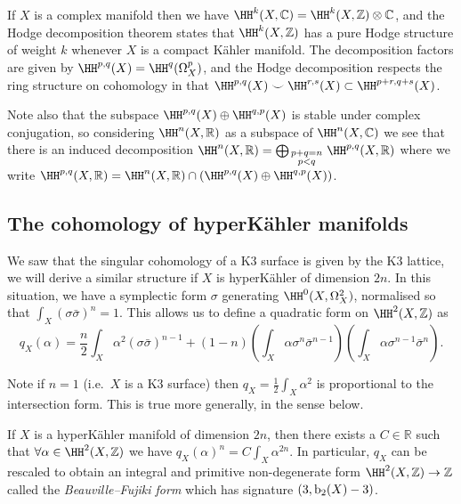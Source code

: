 If \(X\) is a complex manifold then we have \(\HH^k(X,\mathbb{C})=\HH^k(X,\mathbb{Z})\otimes \mathbb{C}\), and the Hodge decomposition theorem states that \(\HH^k(X,\mathbb{Z})\) has a pure Hodge structure of weight \(k\) whenever \(X\) is a compact K\"ahler manifold. The decomposition factors are given by \(\HH^{p,q}(X)=\HH^q(\Omega_X^p)\), and the Hodge decomposition respects the ring structure on cohomology in that \(\HH^{p,q}(X)\smile \HH^{r,s}(X)\subset \HH^{p+r,q+s}(X)\).

Note also that the subspace \(\HH^{p,q}(X)\oplus \HH^{q,p}(X)\) is stable under
complex conjugation, so considering \(\HH^n(X,\mathbb{R})\) as a subspace of
\(\HH^n(X,\mathbb{C})\) we see that there is an induced decomposition
\(\HH^n(X,\mathbb{R})=\bigoplus_{\begin{smallmatrix}{p+q=n}\\{p<q}\end{smallmatrix}}\HH^{p,q}(X,\mathbb{R})\)
where we write \(\HH^{p,q}(X,\mathbb{R})=\HH^n(X,\mathbb{R})\cap
(\HH^{p,q}(X)\oplus \HH^{q,p}(X))\).

\subsection{The cohomology of hyperK\"ahler manifolds} We saw that the singular
cohomology of a K3 surface is given by the K3 lattice, we will derive a similar
structure if \(X\) is hyperK\"ahler of dimension \(2n\). In this situation, we
have a symplectic form \(\sigma\) generating \(\HH^0(X,\Omega^2_X)\),
normalised so that \(\int_X (\sigma\bar\sigma)^n=1\). This allows us to define a
quadratic form on \(\HH^2(X,\mathbb{Z})\) as
\[
    q_X(\alpha)=\frac{n}{2}
    \int_X \alpha^2(\sigma\bar\sigma)^{n-1}+(1-n)
    \left(\int_X\alpha\sigma^n\bar\sigma^{n-1}\right)
    \left(\int_X\alpha\sigma^{n-1}\bar\sigma^n\right).
\]

Note if \(n=1\) (i.e.\ \(X\) is a K3 surface) then \(q_X=\frac{1}{2}\int_X
\alpha^2\) is proportional to the intersection form. This is true more
generally, in the sense below.

\begin{theorem}
    If \(X\) is a hyperK\"ahler manifold of dimension \(2n\), then there exists
    a \(C\in \mathbb{R}\) such that \(\forall \alpha\in \HH^2(X,\mathbb{Z})\) we
    have \(q_X(\alpha)^n=C\int_X \alpha^{2n}\). In particular, \(q_X\)
    can be rescaled to obtain an integral and primitive non-degenerate form
    \(\HH^2(X,\mathbb{Z})\to \mathbb{Z}\) called the \emph{Beauville--Fujiki
    form} which has signature \((3,\textnormal{b}_2(X)-3)\).
\end{theorem}

